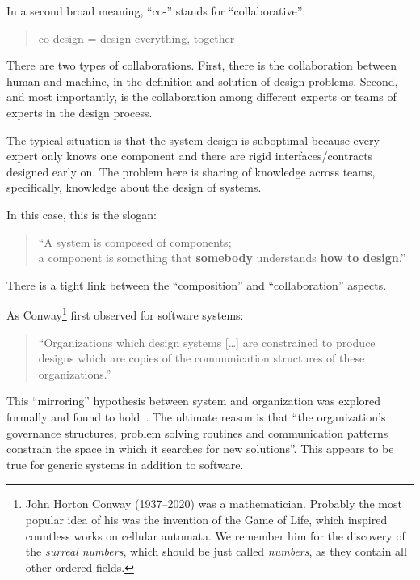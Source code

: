 In a second broad meaning, ``co-'' stands for ``collaborative'':

\begin{quote}
    co-design = design everything, together
\end{quote}


There are two types of collaborations.
First, there is the collaboration between human and machine, in the definition and solution of design problems.
Second, and most importantly, is the collaboration among different experts or teams of experts in the design process.

The typical situation is that the system design is suboptimal because every expert only knows one component and there are rigid interfaces/contracts designed early on.
The problem here is sharing of knowledge across teams, specifically, knowledge about the design of systems.

In this case, this is the slogan:

\begin{quote}
    \enquote{A system is composed of components;\\
    a component is something that \textbf{somebody} understands
    \textbf{how to design}.}
\end{quote}


There is a tight link between the ``composition'' and ``collaboration'' aspects.

As Conway\footnote{John Horton Conway (1937--2020) was a mathematician. Probably the most popular idea of his was the invention of the Game of Life, which inspired countless works on cellular automata. We remember him for the discovery of the \emph{surreal numbers}, which should be just called \emph{numbers}, as they contain all other ordered fields.} first observed for software systems:

\begin{quote}
    \enquote{Organizations which design systems [\dots] are constrained to produce designs which are copies of the communication structures of these organizations.}
\end{quote}


This ``mirroring'' hypothesis between system and organization was explored formally and found to hold~\cite{maccormack12exploring}. The ultimate reason is that ``the organization's governance structures, problem solving routines and communication patterns constrain the space in which it searches for new solutions''. This appears to be true for generic systems in addition to software.

